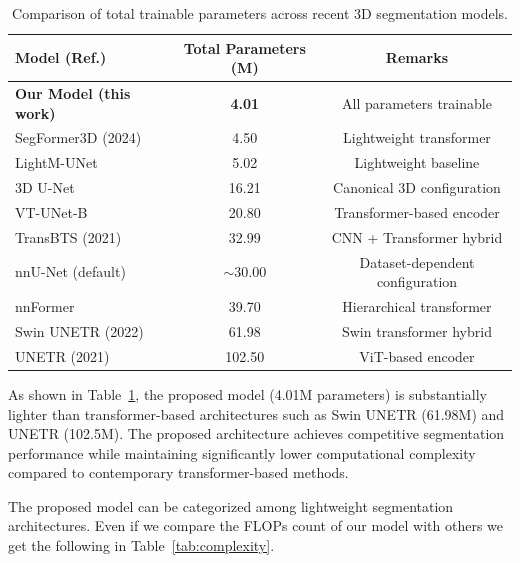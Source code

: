 \begin{table}[!htbp]
    \caption{Comparison of total trainable parameters across recent 3D segmentation models.}
    \label{tab:parameter_comparison}
    \centering
    \begin{tabular}{lcc}
        \toprule
        Model (Ref.) & Total Parameters (M) & Remarks \\
        \midrule
        \textbf{Our Model (this work)} & \textbf{4.01} & All parameters trainable \\
        SegFormer3D (2024) & 4.50 & Lightweight transformer \\
        LightM-UNet & 5.02 & Lightweight baseline \\
        3D U-Net & 16.21 & Canonical 3D configuration \\
        VT-UNet-B & 20.80 & Transformer-based encoder \\
        TransBTS (2021) & 32.99 & CNN + Transformer hybrid \\
        nnU-Net (default) & $\sim$30.00 & Dataset-dependent configuration \\
        nnFormer & 39.70 & Hierarchical transformer \\
        Swin UNETR (2022) & 61.98 & Swin transformer hybrid \\
        UNETR (2021) & 102.50 & ViT-based encoder \\
        \bottomrule
    \end{tabular}
\end{table}

As shown in Table~\ref{tab:parameter_comparison}, the proposed model (4.01M parameters) is substantially lighter than transformer-based architectures such as Swin UNETR (61.98M) and UNETR (102.5M). The proposed architecture achieves competitive segmentation performance while maintaining significantly lower computational complexity compared to contemporary transformer-based methods.

{\sloppy The proposed model can be categorized among lightweight segmentation architectures. Even if we compare the FLOPs count of our model with others we get the following in Table~\ref{tab:complexity}.\par}

